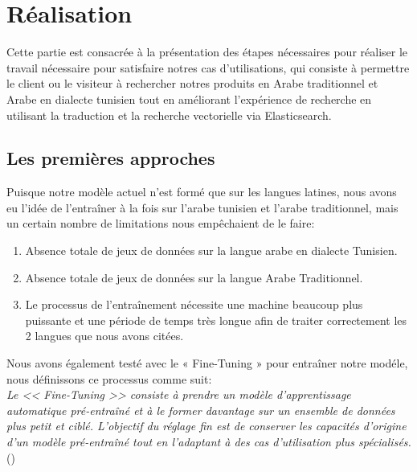 

\section{Réalisation}
\noindent
Cette partie est consacrée à la présentation des étapes nécessaires pour réaliser le travail nécessaire pour satisfaire notres cas d'utilisations, qui consiste à permettre le client ou le visiteur à rechercher notres produits en Arabe traditionnel et Arabe en dialecte tunisien tout en améliorant l'expérience de recherche en utilisant la traduction et la recherche vectorielle via Elasticsearch.

\subsection{Les premières approches}
\noindent
Puisque notre modèle actuel n'est formé que sur les langues latines, nous avons eu l'idée de l'entraîner à la fois sur l'arabe tunisien et l'arabe traditionnel, mais un certain nombre de limitations nous empêchaient de le faire:

\begin{enumerate}
	\item Absence totale de jeux de données sur la langue arabe en dialecte Tunisien.
	\item Absence totale de jeux de données sur la langue Arabe Traditionnel.
	\item Le processus de l'entraînement nécessite une machine beaucoup plus puissante et une période de temps très longue afin de traiter correctement les 2 langues que nous avons citées.
\end{enumerate}

\noindent
Nous avons également testé avec le « Fine-Tuning » pour entraîner notre modéle, nous définissons ce processus comme suit: \\
\textit{Le << Fine-Tuning >> consiste à prendre un modèle d'apprentissage automatique pré-entraîné et à le former davantage sur un ensemble de données plus petit et ciblé. L'objectif du réglage fin est de conserver les capacités d'origine d'un modèle pré-entraîné tout en l'adaptant à des cas d'utilisation plus spécialisés.} \\  (\cite{techtarget:finetuning})

